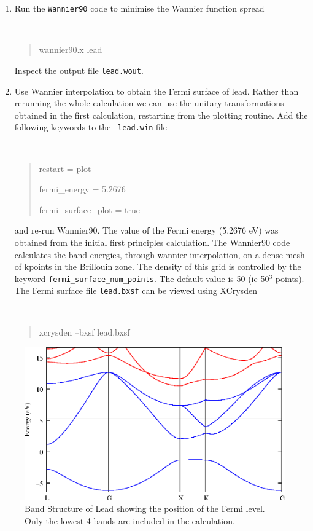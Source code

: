 \documentclass[a4paper,11pt,twoside]{article}
\begin{document}
\begin{enumerate}
\item Run the {\tt Wannier90} code to minimise the Wannier function spread
{\tt
\begin{quote}
wannier90.x lead
\end{quote} }
Inspect the output file {\tt lead.wout}.
\item Use Wannier interpolation to obtain the Fermi surface of
  lead. Rather than rerunning the whole calculation we can use the
  unitary transformations obtained in the first calculation, restarting
  from the plotting routine. Add the following keywords to the {\tt
    lead.win} file 
{\tt
\begin{quote}
restart = plot

fermi\_energy = 5.2676

fermi\_surface\_plot = true
\end{quote} }
and re-run Wannier90. The value of the Fermi energy (5.2676 eV) was
obtained from the initial first principles calculation. The Wannier90
code calculates the band energies, through wannier interpolation, on a
dense mesh of kpoints in the Brillouin zone. The density of this grid is
controlled by the keyword {\tt fermi\_surface\_num\_points}. The default
value is 50 (ie 50$^3$ points). 
The Fermi surface file {\tt lead.bxsf} can be viewed using XCrysden
{\tt
\begin{quote}
xcrysden --bxsf lead.bxsf
\end{quote} }
\end{enumerate}

\begin{figure}[h]
\begin{center}
\includegraphics{lead.eps}
\caption{Band Structure of Lead showing the position of the Fermi
  level. Only the lowest 4 bands are included in the calculation.} 
\label{fig:pb-bnd}
\end{center}
\end{figure}
\end{document}
